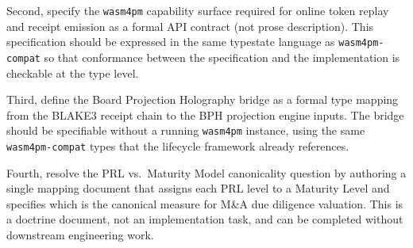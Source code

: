 Second, specify the \texttt{wasm4pm} capability surface required for online token
replay and receipt emission as a formal API contract (not prose description). This
specification should be expressed in the same typestate language as
\texttt{wasm4pm-compat} so that conformance between the specification and the
implementation is checkable at the type level.

Third, define the Board Projection Holography bridge as a formal type mapping from the
BLAKE3 receipt chain to the BPH projection engine inputs. The bridge should be
specifiable without a running \texttt{wasm4pm} instance, using the same
\texttt{wasm4pm-compat} types that the lifecycle framework already references.

Fourth, resolve the PRL vs.\ Maturity Model canonicality question by authoring a
single mapping document that assigns each PRL level to a Maturity Level and specifies
which is the canonical measure for M\&A due diligence valuation. This is a doctrine
document, not an implementation task, and can be completed without downstream
engineering work.
